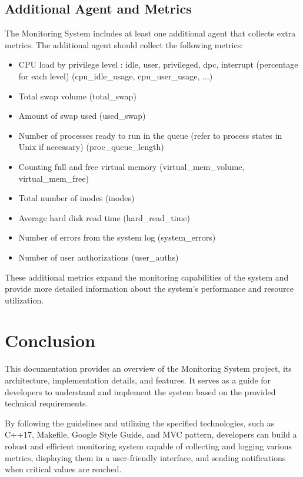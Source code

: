 \documentclass[12pt, a4paper]{article}
\begin{document}
\subsection{Additional Agent and Metrics}
The Monitoring System includes at least one additional agent that collects extra metrics. The additional agent should collect the following metrics:
\begin{itemize}
    \item {\ttfamily [double]} CPU load by privilege level : idle, user, privileged, dpc, interrupt (percentage for each level) ({\ttfamily cpu\_idle\_usage, cpu\_user\_usage, ...})
    \item {\ttfamily [double]} Total swap volume ({\ttfamily total\_swap})
    \item {\ttfamily [double]} Amount of swap used ({\ttfamily used\_swap})
    \item {\ttfamily [int]} Number of processes ready to run in the queue (refer to process states in Unix if necessary) ({\ttfamily proc\_queue\_length})
    \item {\ttfamily [double]} Counting full and free virtual memory ({\ttfamily virtual\_mem\_volume, virtual\_mem\_free})
    \item {\ttfamily [int]} Total number of inodes ({\ttfamily inodes})
    \item {\ttfamily [double]} Average hard disk read time ({\ttfamily hard\_read\_time})
    \item {\ttfamily [int]} Number of errors from the system log ({\ttfamily system\_errors})
    \item {\ttfamily [int]} Number of user authorizations ({\ttfamily user\_auths})
\end{itemize}

{\fontsize{10}{10}\selectfont These additional metrics expand the monitoring capabilities of the system and provide more detailed information about the system's performance and resource utilization.}

\section*{Conclusion}

This documentation provides an overview of the Monitoring System project, its architecture, implementation details, and features. It serves as a guide for developers to understand and implement the system based on the provided technical requirements.

By following the guidelines and utilizing the specified technologies, such as C++17, Makefile, Google Style Guide, and MVC pattern, developers can build a robust and efficient monitoring system capable of collecting and logging various metrics, displaying them in a user-friendly interface, and sending notifications when critical values are reached.
\end{document}

